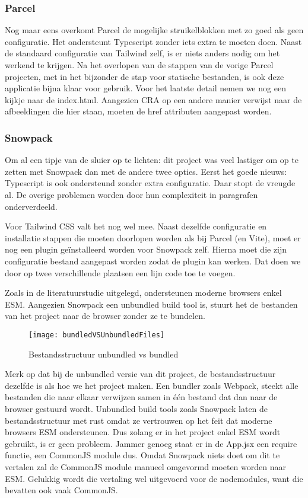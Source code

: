 \subsubsection{Parcel}

Nog maar eens overkomt Parcel de mogelijke struikelblokken met zo goed als geen configuratie. Het ondersteunt Typescript zonder iets extra te moeten doen. Naast de standaard configuratie van Tailwind zelf, is er niets anders nodig om het werkend te krijgen. Na het overlopen van de stappen van de vorige Parcel projecten, met in het bijzonder de stap voor statische bestanden, is ook deze applicatie bijna klaar voor gebruik. Voor het laatste detail nemen we nog een kijkje naar de index.html. Aangezien CRA op een andere manier verwijst naar de afbeeldingen die hier staan, moeten de href attributen aangepast worden.

\subsubsection{Snowpack}
Om al een tipje van de sluier op te lichten: dit project was veel lastiger om op te zetten met Snowpack dan met de andere twee opties. Eerst het goede nieuws: Typescript is ook ondersteund zonder extra configuratie. Daar stopt de vreugde al. De overige problemen worden door hun complexiteit in paragrafen onderverdeeld. 

Voor Tailwind CSS valt het nog wel mee. Naast dezelfde configuratie en installatie stappen die moeten doorlopen worden als bij Parcel (en Vite), moet er nog een plugin geïnstalleerd worden voor Snowpack zelf. Hierna moet die zijn configuratie bestand aangepast worden zodat de plugin kan werken. Dat doen we door op twee verschillende plaatsen een lijn code toe te voegen. 

Zoals in de literatuurstudie uitgelegd, ondersteunen moderne browsers enkel ESM. Aangezien Snowpack een unbundled build tool is, stuurt het de bestanden van het project naar de browser zonder ze te bundelen. 

\begin{figure}[h]
    \texttt{[image: bundledVSUnbundledFiles]}
        \centering
        \caption{Bestandsstructuur unbundled vs bundled}
    \end{figure}

    Merk op dat bij de unbundled versie van dit project, de bestandsstructuur dezelfde is als hoe we het project maken. Een bundler zoals Webpack, steekt alle bestanden die naar elkaar verwijzen samen in één bestand dat dan naar de browser gestuurd wordt. Unbundled build tools zoals Snowpack laten de bestandsstructuur met rust omdat ze vertrouwen op het feit dat moderne browsers ESM ondersteunen. Dus zolang er in het project enkel ESM wordt gebruikt, is er geen probleem. Jammer genoeg staat er in de App.jsx een require functie, een CommonJS module dus. Omdat Snowpack niets doet om dit te vertalen zal de CommonJS module manueel omgevormd moeten worden naar ESM. Gelukkig wordt die vertaling wel uitgevoerd voor de nodemodules, want die bevatten ook vaak CommonJS.

